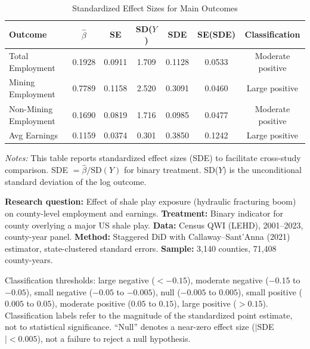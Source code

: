 \begin{table}[H]
\centering
\caption{Standardized Effect Sizes for Main Outcomes}
\label{tab:sde}
\footnotesize
\begin{tabular}{lcccccc}
\toprule
Outcome & $\hat{\beta}$ & SE & SD($Y$) & SDE & SE(SDE) & Classification \\
\midrule
Total Employment & 0.1928 & 0.0911 & 1.709 & 0.1128 & 0.0533 & Moderate positive \\
Mining Employment & 0.7789 & 0.1158 & 2.520 & 0.3091 & 0.0460 & Large positive \\
Non-Mining Employment & 0.1690 & 0.0819 & 1.716 & 0.0985 & 0.0477 & Moderate positive \\
Avg Earnings & 0.1159 & 0.0374 & 0.301 & 0.3850 & 0.1242 & Large positive \\
\bottomrule
\end{tabular}
\par\vspace{0.3em}
{\footnotesize \emph{Notes:} This table reports standardized effect sizes (SDE) to facilitate cross-study comparison. SDE $= \hat{\beta} / \text{SD}(Y)$ for binary treatment. SD($Y$) is the unconditional standard deviation of the log outcome.

\textbf{Research question:} Effect of shale play exposure (hydraulic fracturing boom) on county-level employment and earnings.
\textbf{Treatment:} Binary indicator for county overlying a major US shale play.
\textbf{Data:} Census QWI (LEHD), 2001--2023, county-year panel.
\textbf{Method:} Staggered DiD with Callaway--Sant'Anna (2021) estimator, state-clustered standard errors.
\textbf{Sample:} 3,140 counties, 71,408 county-years.

Classification thresholds: large negative ($< -0.15$), moderate negative ($-0.15$ to $-0.05$), small negative ($-0.05$ to $-0.005$), null ($-0.005$ to $0.005$), small positive ($0.005$ to $0.05$), moderate positive ($0.05$ to $0.15$), large positive ($> 0.15$). Classification labels refer to the magnitude of the standardized point estimate, not to statistical significance. ``Null'' denotes a near-zero effect size ($|$SDE$| < 0.005$), not a failure to reject a null hypothesis.}
\end{table}
